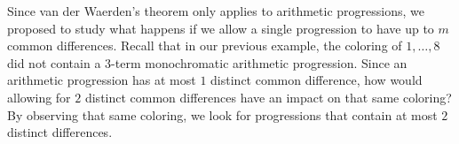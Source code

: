 \documentclass[ fontsize=10pt,twoside]{scrartcl}	%
\begin{document}
Since van der Waerden's theorem only applies to arithmetic progressions, we proposed to study what happens if we allow a single progression to have up to $m$ common differences. Recall that in our previous example, the coloring of $1,\ldots,8$ did not contain a $3$-term monochromatic arithmetic progression. Since an arithmetic progression has at most $1$ distinct common difference, how would allowing for $2$ distinct common differences have an impact on that same coloring? By observing that same coloring, we look for progressions that contain at most $2$ distinct differences.
\begin{center}
\end{center}
\end{document}
